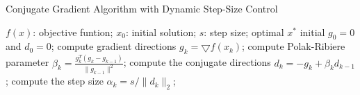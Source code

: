 \documentclass[UTF8]{article}
\begin{document}
\begin{algorithm}[h]
\caption{Conjugate Gradient Algorithm with Dynamic Step-Size Control}
\label{alg::conjugateGradient}
\begin{algorithmic}[1]
\Require
$f(x)$: objective funtion;
$x_0$: initial solution;
$s$: step size;
\Ensure
optimal $x^{*}$
\State initial $g_0=0$ and $d_0=0$;
\Repeat
\State compute gradient directions $g_k=\bigtriangledown f(x_k)$;
\State compute Polak-Ribiere parameter $\beta_k=\frac{g_k^{T}(g_k-g_{k-1})}{\parallel g_{k-1} \parallel^{2}}$;
\State compute the conjugate directions $d_k=-g_k+\beta_k d_{k-1}$;
\State compute the step size $\alpha_k=s/\parallel d_k \parallel_{2}$;
\end{algorithmic}
\end{algorithm}


\iffalse
\section{Style 4.}
\usepackage[linesnumbered,boxed]{algorithm2e}

\begin{algorithm}
\caption{identifyRowContext}
\KwIn{$r_i$, $Backgrd(T_i)$=${T_1,T_2,\ldots ,T_n}$ and similarity threshold $\theta_r$}
\KwOut{$con(r_i)$}
$con(r_i)= \Phi$\;
\For{$j=1;j \le n;j \ne i$}
{
float $maxSim=0$\;
$r^{maxSim}=null$\;
\While{not end of $T_j$}
{
compute Jaro($r_i,r_m$)($r_m\in T_j$)\;
\If{$(Jaro(r_i,r_m) \ge \theta_r)\wedge (Jaro(r_i,r_m)\ge r^{maxSim})$}
{
replace $r^{maxSim}$ with $r_m$\;
}
}
$con(r_i)=con(r_i)\cup {r^{maxSim}}$\;
}
return $con(r_i)$\;
\end{algorithm}

如果想要去掉算法中的竖线:

在\begin{algorithm}之后加入\SetAlgoNoLine

\fi
\end{document}
